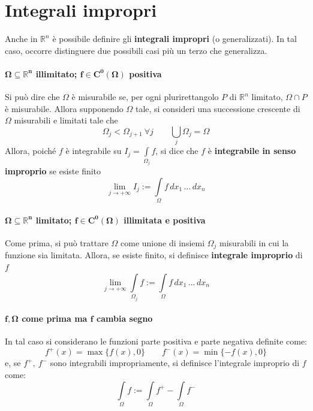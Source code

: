 \section{Integrali impropri}
Anche in $\mathbb{R}^n$ è possibile definire gli \textbf{integrali impropri} (o generalizzati). In tal caso, occorre distinguere due possibili casi più un terzo che generalizza.
\paragraph{$\mathbf{\Omega \subseteq \mathbb{R}^n}$ illimitato; $\mathbf{f \in C^0(\Omega)}$ positiva}
Si può dire che $\Omega$ è misurabile se, per ogni plurirettangolo $P$ di $\mathbb{R}^n$ limitato, $\Omega \cap P$ è misurabile. Allora supponendo $\Omega$ tale, si consideri una successione crescente di $\Omega$ misurabili e limitati tale che 
\begin{equation*}
 \Omega_j<\Omega_{j+1}\ \forall j \qquad \bigcup\limits_{j}{\Omega_j}=\Omega
\end{equation*}
Allora, poiché $f$ è integrabile su $I_j=\int\limits_{\Omega_j}{f}$, si dice che $f$ è \textbf{integrabile in senso improprio} se esiste finito
\begin{equation*}
    \lim_{j \to +\infty} I_j := \int\limits_\Omega{f}\,dx_1\, \dots \,dx_n
\end{equation*}
\paragraph{$\mathbf{\Omega \subseteq \mathbb{R}^n}$ limitato; $\mathbf{f \in C^0(\Omega)}$ illimitata e positiva} Come prima, si può trattare $\Omega$ come unione di insiemi $\Omega_j$ misurabili in cui la funzione sia limitata. Allora, se esiste finito, si definisce \textbf{integrale improprio} di $f$
\begin{equation*}
    \lim_{j \to +\infty} \int\limits_{\Omega_j}f :=    \int\limits_{\Omega} f\,dx_1\, \dots \,dx_n
\end{equation*}
\paragraph{$\mathbf{f, \Omega}$ come prima ma $\mathbf{f}$ cambia segno} In tal caso si considerano le funzioni parte positiva e parte negativa definite come:
\begin{equation*}
    f^+(x)=\max\{f(x), 0\} \qquad f^-(x)=\min\{-f(x), 0\}
\end{equation*}
e, se $f^+,\ f^-$ sono integrabili impropriamente, si definisce l'integrale improprio di $f$ come:
\begin{equation*}
    \int\limits_{\Omega}f := \int\limits_{\Omega} f^+ - \int\limits_{\Omega} f^-
\end{equation*}
